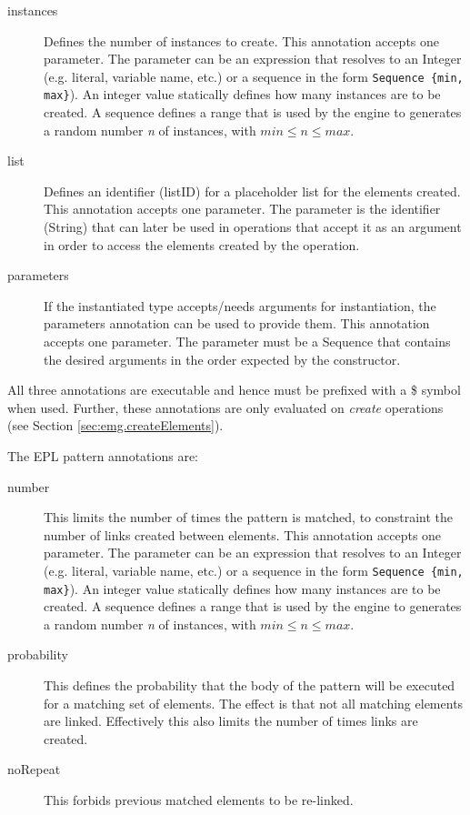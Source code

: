 \begin{description}
    \item[instances] Defines the number of instances to create. This annotation accepts one parameter. The parameter can be an expression that resolves to an Integer (e.g. literal, variable name, etc.)  or a sequence in the form \texttt{Sequence \{min, max\}}). An integer value statically defines how many instances are to be created. A sequence defines a range that is used by the engine to generates a random number \emph{n} of instances, with $min \le n \le max$.
    \item[list] Defines an identifier (listID) for a placeholder list for the elements created. This annotation accepts one parameter. The parameter is the identifier (String) that can later be used in operations that accept it as an argument in order to access the elements created by the operation. 
    \item[parameters] If the instantiated type accepts/needs arguments for instantiation, the parameters annotation can be used to provide them. This annotation accepts one parameter. The parameter must be a Sequence that contains the desired arguments in the order expected by the constructor. 
\end{description}

All three annotations are executable and hence must be prefixed with a \$ symbol when used. Further, these annotations are only evaluated on \emph{create} operations (see Section \ref{sec:emg.createElements}). 

The EPL pattern annotations are:

\begin{description}
    \item[number] This limits the number of times the pattern is matched, to constraint the number of links created between elements. This annotation accepts one parameter. The parameter can be an expression that resolves to an Integer (e.g. literal, variable name, etc.)  or a sequence in the form \texttt{Sequence \{min, max\}}). An integer value statically defines how many instances are to be created. A sequence defines a range that is used by the engine to generates a random number \emph{n} of instances, with $min \le n \le max$.
    \item[probability] This defines the probability that the body of the pattern will be executed for a matching set of elements. The effect is that not all matching elements are linked. Effectively this also limits the number of times links are created.  
    \item[noRepeat] This forbids previous matched elements to be re-linked. 
\end{description}

